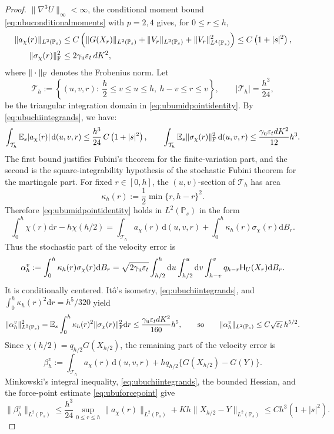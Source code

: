 \documentclass[11pt]{article}
\theoremstyle{definition}
\newcommand{\E}{\mathbb E}
\newcommand{\dd}{\mathrm d}
\newcommand{\eps}{\varepsilon}
\begin{document}
\begin{proof}
$\|\nabla^3U\|_\infty<\infty$, the conditional moment bound
\eqref{eq:ubuconditionalmoments} with $p=2,4$ gives, for $0\leq r\leq h$,
\begin{equation}\label{eq:ubuchiintegrands}
\begin{aligned}
 \|a_\chi(r)\|_{L^2(\mathbb P_s)}
 &\leq C\left(\|G(X_r)\|_{L^2(\mathbb P_s)}+\|V_r\|_{L^2(\mathbb P_s)}
       +\|V_r\|_{L^4(\mathbb P_s)}^2\right)
 \leq C\left(1+|s|^2\right),\\
 \|\sigma_\chi(r)\|_{\rm F}^2
 &\leq2\gamma_{\rm u}\eps_t\,dK^2,
\end{aligned}
\end{equation}
where $\|\cdot\|_{\rm F}$ denotes the Frobenius norm. Let
\[
 \mathcal T_h:=\left\{(u,v,r):\ \frac h2\leq v\leq u\leq h,\
 h-v\leq r\leq v\right\},
 \qquad |\mathcal T_h|=\frac{h^3}{24},
\]
be the triangular integration domain in \eqref{eq:ubumidpointidentity}. By
\eqref{eq:ubuchiintegrands}, we have:
\begin{equation}\label{eq:ubufubiniconditions}
 \int_{\mathcal T_h}\E_s|a_\chi(r)|\,\dd(u,v,r)
 \leq\frac{h^3}{24}\,C\left(1+|s|^2\right),
 \qquad
 \int_{\mathcal T_h}\E_s\|\sigma_\chi(r)\|_{\rm F}^2\,\dd(u,v,r)
 \leq\frac{\gamma_{\rm u}\eps_t dK^2}{12}h^3.
\end{equation}
The first bound justifies Fubini's theorem for the finite-variation part,
and the second is the square-integrability hypothesis of the stochastic
Fubini theorem for the martingale part. For fixed $r\in[0,h]$, the
$(u,v)$-section of $\mathcal T_h$ has area
\[
 \kappa_h(r):=\frac12\min\{r,h-r\}^2.
\]
Therefore \eqref{eq:ubumidpointidentity} holds in $L^2(\mathbb P_s)$ in the form
\begin{equation}\label{eq:ubuvelocitysplit}
 \int_0^h\chi(r)\dd r-h\chi(h/2)
 =\int_{\mathcal T_h}a_\chi(r)\,\dd(u,v,r)
  +\int_0^h\kappa_h(r)\sigma_\chi(r)\dd B_r.
\end{equation}
Thus the stochastic part of the velocity error is
\[
 \alpha_h^v:=\int_0^h\kappa_h(r)\sigma_\chi(r)\dd B_r
 =\sqrt{2\gamma_{\rm u}\eps_t}
 \int_{h/2}^h\dd u\int_{h/2}^u\dd v
       \int_{h-v}^{v}q_{h-r}\mathsf H_U(X_r)\dd B_r.
\]
It is conditionally centered. It\^o's isometry,
\eqref{eq:ubuchiintegrands}, and $\int_0^h\kappa_h(r)^2\dd r=h^5/320$ yield
\[
 \|\alpha_h^v\|_{L^2(\mathbb P_s)}^2
 =\E_s\int_0^h\kappa_h(r)^2\|\sigma_\chi(r)\|_{\rm F}^2\dd r
 \leq\frac{\gamma_{\rm u}\eps_t dK^2}{160}h^5,
 \qquad\text{so}\qquad
 \|\alpha_h^v\|_{L^2(\mathbb P_s)}\leq C\sqrt{\eps_t}\,h^{5/2}.
\]
Since $\chi(h/2)=q_{h/2}G(X_{h/2})$, the remaining part of the velocity error is
\[
 \beta_h^v:=\int_{\mathcal T_h}a_\chi(r)\,\dd(u,v,r)
 +hq_{h/2}\{G(X_{h/2})-G(Y)\}.
\]
Minkowski's integral inequality, \eqref{eq:ubuchiintegrands}, the bounded
Hessian, and the force-point estimate \eqref{eq:ubuforcepoint} give
\[
 \|\beta_h^v\|_{L^2(\mathbb P_s)}
 \leq\frac{h^3}{24}\sup_{0\leq r\leq h}\|a_\chi(r)\|_{L^2(\mathbb P_s)}
 +Kh\|X_{h/2}-Y\|_{L^2(\mathbb P_s)}
 \leq Ch^3\left(1+|s|^2\right).
\]


\end{proof}
\end{document}
